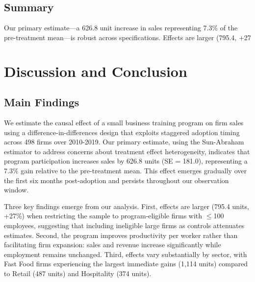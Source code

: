 \documentclass{article}
\begin{document}
\subsection{Summary}

Our primary estimate—a 626.8 unit increase in sales representing 7.3\% of the pre-treatment mean—is robust across specifications. Effects are larger (795.4, +27%

\section{Discussion and Conclusion}
\label{sec:discussion}

\subsection{Main Findings}

We estimate the causal effect of a small business training program on firm sales using a difference-in-differences design that exploits staggered adoption timing across 498 firms over 2010-2019. Our primary estimate, using the Sun-Abraham estimator to address concerns about treatment effect heterogeneity, indicates that program participation increases sales by 626.8 units (SE = 181.0), representing a 7.3\% gain relative to the pre-treatment mean. This effect emerges gradually over the first six months post-adoption and persists throughout our observation window.

Three key findings emerge from our analysis. First, effects are larger (795.4 units, +27\%) when restricting the sample to program-eligible firms with $\leq$100 employees, suggesting that including ineligible large firms as controls attenuates estimates. Second, the program improves productivity per worker rather than facilitating firm expansion: sales and revenue increase significantly while employment remains unchanged. Third, effects vary substantially by sector, with Fast Food firms experiencing the largest immediate gains (1,114 units) compared to Retail (487 units) and Hospitality (374 units).
\end{document}
